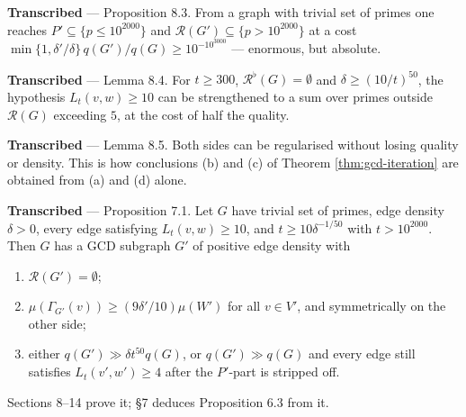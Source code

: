 \begin{proposition}
  \label{prop:small-primes}
  \notready
  \textbf{Transcribed} --- Proposition 8.3. From a graph with trivial set of primes one
  reaches $P' \subseteq \{p \leq 10^{2000}\}$ and
  $\mathcal{R}(G') \subseteq \{p > 10^{2000}\}$ at a cost
  $\min\{1,\delta'/\delta\}\, q(G')/q(G) \geq 10^{-10^{3000}}$ --- enormous, but absolute.
\end{proposition}

\begin{lemma}
  \label{lem:cosmetic}
  \notready
  \textbf{Transcribed} --- Lemma 8.4. For $t \geq 300$, $\mathcal{R}^\flat(G) = \emptyset$
  and $\delta \geq (10/t)^{50}$, the hypothesis $L_t(v,w) \geq 10$ can be strengthened to
  a sum over primes outside $\mathcal{R}(G)$ exceeding $5$, at the cost of half the
  quality.
\end{lemma}

\begin{lemma}
  \label{lem:high-degree}
  \notready
  \textbf{Transcribed} --- Lemma 8.5. Both sides can be regularised without losing quality
  or density. This is how conclusions (b) and (c) of Theorem \ref{thm:gcd-iteration} are
  obtained from (a) and (d) alone.
\end{lemma}

\begin{theorem}
  \label{thm:gcd-iteration}
  \notready
  \textbf{Transcribed} --- Proposition 7.1. Let $G$ have trivial set of primes, edge
  density $\delta > 0$, every edge satisfying $L_t(v,w) \geq 10$, and
  $t \geq 10\delta^{-1/50}$ with $t > 10^{2000}$. Then $G$ has a GCD subgraph $G'$ of
  positive edge density with
  \begin{enumerate}
    \item $\mathcal{R}(G') = \emptyset$;
    \item $\mu(\Gamma_{G'}(v)) \geq (9\delta'/10)\mu(W')$ for all $v \in V'$, and
      symmetrically on the other side;
    \item either $q(G') \gg \delta t^{50} q(G)$, or $q(G') \gg q(G)$ and every edge still
      satisfies $L_t(v',w') \geq 4$ after the $P'$-part is stripped off.
  \end{enumerate}
  Sections 8--14 prove it; \S7 deduces Proposition 6.3 from it.
\end{theorem}

